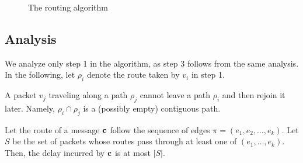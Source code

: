 \begin{figure}
    \begin{center}
       \vspace{-0.61cm}
   \end{center}

   \caption{The routing algorithm}
\end{figure}

\subsection{Analysis}
We analyze only step 1 in the algorithm, as step 3 follows from the
same analysis.  In the following, let $\rho_i$ denote the route taken
by $v_i$ in step 1.

\begin{exercise}
    A packet $v_j$ traveling along a path $\rho_j$ cannot leave a path
    $\rho_i$ and then rejoin it later. Namely, $\rho_i \cap \rho_j$ is a
    (possibly empty) contiguous path.
\end{exercise}

\begin{lemma}
    Let the route of a message $\mathbf{c}$ follow the sequence of edges
    $\pi = (e_1, e_2, \ldots, e_k)$. Let $S$ be the set of packets
    whose routes pass through at least one of $(e_1, \ldots, e_k)$.
    Then, the delay incurred by $\mathbf{c}$ is at most $|S|$.
\end{lemma}

